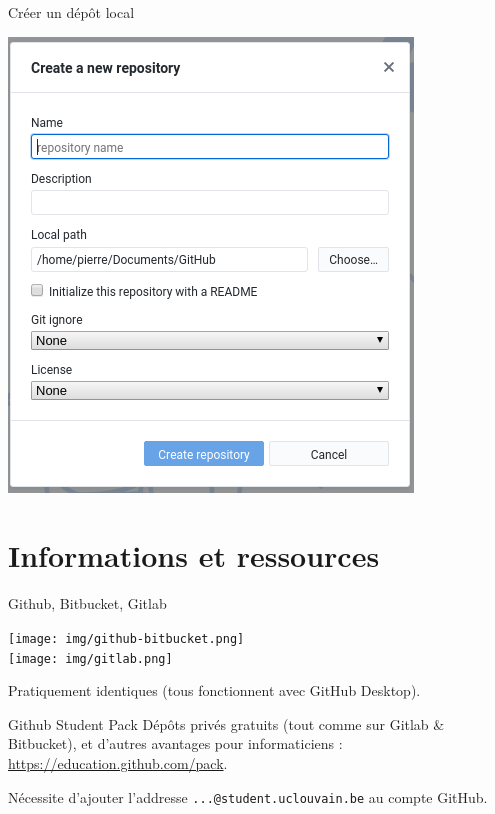 \documentclass{beamer}
\begin{document}
\begin{frame}{Créer un dépôt local}
    \begin{center}
    	\includegraphics[scale=0.45]{img/new_repo.png}
    \end{center}
\end{frame}

\section{Informations et ressources}

\begin{frame}{Github, Bitbucket, Gitlab}
    \begin{center}
        \texttt{[image: img/github-bitbucket.png]} \\
        \texttt{[image: img/gitlab.png]}
    \end{center}
    Pratiquement identiques (tous fonctionnent avec GitHub Desktop).
\end{frame}

\begin{frame}{Github Student Pack}
    Dépôts privés gratuits (tout comme sur Gitlab \& Bitbucket), et d'autres avantages pour informaticiens : \url{https://education.github.com/pack}.

    Nécessite d'ajouter l'addresse \texttt{...@student.uclouvain.be} au compte
    GitHub.
\end{frame}
\end{document}
